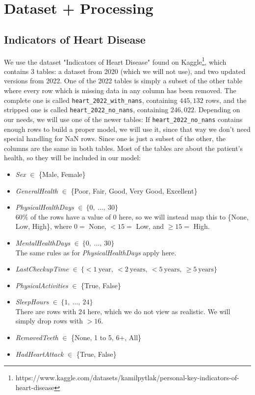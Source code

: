 \documentclass{article}
\begin{document}
\newpage

\section{Dataset + Processing}

\subsection{Indicators of Heart Disease}
We use the dataset "Indicators of Heart Disease" found on Kaggle\footnote{https://www.kaggle.com/datasets/kamilpytlak/personal-key-indicators-of-heart-disease},
which contains 3 tables: a dataset from 2020 (which we will not use),
and two updated versions from 2022.
One of the 2022 tables is simply a subset of the other table where every row which is missing data in any column has been removed.
The complete one is called \texttt{heart\_2022\_with\_nans}, containing $445,132$ rows,
and the stripped one is called \texttt{heart\_2022\_no\_nans}, containing $246,022$.
Depending on our needs, we will use one of the newer tables:
If \texttt{heart\_2022\_no\_nans} contains enough rows to build a proper model,
we will use it, since that way we don't need special handling for NaN rows.
Since one is just a subset of the other, the columns are the same in both tables.
Most of the tables are about the patient's health, so they will be included in our model:

\begin{itemize}
    \item \textit{Sex} $\in$ \{Male, Female\}
    \item \textit{GeneralHealth} $\in$ \{Poor, Fair, Good, Very Good, Excellent\}
    \item \textit{PhysicalHealthDays} $\in\ \{ 0,\ \dots,\ 30 \}$\\
    $60\%$ of the rows have a value of $0$ here, so we will instead map this to
    \{None, Low, High\}, where $0 = $ None, $<15 = $ Low, and $\geq15 =$ High.
    \item \textit{MentalHealthDays}  $\in\ \{ 0,\ \dots,\ 30 \}$\\
    The same rules as for \textit{PhysicalHealthDays} apply here.
    \item \textit{LastCheckupTime} $\in\ \{<1\ \text{year},\ <2\ \text{years},\ <5\ \text{years},\ \geq 5\ \text{years}\}$
    \item \textit{PhysicalActivities} $\in$ \{True, False\}
    \item \textit{SleepHours}  $\in\ \{ 1,\ \dots,\ 24 \}$\\
    There are rows with $24$ here, which we do not view as realistic.
    We will simply drop rows with $>16$.
    \item \textit{RemovedTeeth} $\in$ \{None, 1 to 5, 6+, All\}
    \item \textit{HadHeartAttack} $\in$ \{True, False\}
\end{itemize}
\end{document}
